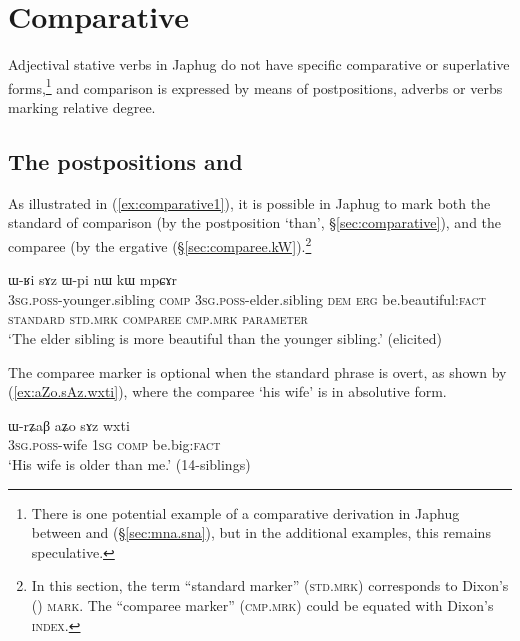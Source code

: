 \section{Comparative} \label{sec:comparison}

Adjectival stative verbs in Japhug do not have specific comparative or superlative forms,\footnote{There is  one potential example of a comparative derivation in Japhug between  and  (§\ref{sec:mna.sna}), but in the additional examples, this remains speculative. } and comparison is expressed by means of postpositions, adverbs or verbs marking relative degree.


\subsection{The postpositions  and } \label{sec:sAz.kW}
As illustrated in (\ref{ex:comparative1}), it is possible in Japhug to mark both the  standard of comparison (by the postposition  `than', §\ref{sec:comparative}), and the comparee (by  the ergative  (§\ref{sec:comparee.kW}).\footnote{In this section, the term ``standard marker'' (\textsc{std}.\textsc{mrk}) corresponds to Dixon's (\citeyear{dixon08comparative}) \textsc{mark}. The ``comparee marker'' (\textsc{cmp}.\textsc{mrk}) could be equated with Dixon's \textsc{index}. } 


\begin{exe}
\ex \label{ex:comparative1}
\glll  ɯ-ʁi sɤz ɯ-pi nɯ {                  } kɯ   mpɕɤr  \\
\textsc{3sg}.\textsc{poss}-younger.sibling \textsc{comp} \textsc{3sg}.\textsc{poss}-elder.sibling \textsc{dem} {   } \textsc{erg} be.beautiful:\textsc{fact} \\
\textsc{standard} \textsc{std}.\textsc{mrk} \textsc{comparee} { } {         } \textsc{cmp}.\textsc{mrk} \textsc{parameter} \\
\glt `The elder sibling is more beautiful than the younger sibling.'  (elicited)
\end{exe}


The comparee marker is optional when the standard phrase is overt, as shown by (\ref{ex:aZo.sAz.wxti}), where the comparee  `his wife' is in absolutive form.

\begin{exe}
\ex \label{ex:aZo.sAz.wxti}
\gll ɯ-rʑaβ aʑo sɤz wxti \\
\textsc{3sg}.\textsc{poss}-wife \textsc{1sg} \textsc{comp} be.big:\textsc{fact} \\
\glt `His wife is older than me.' (14-siblings)
\end{exe}

